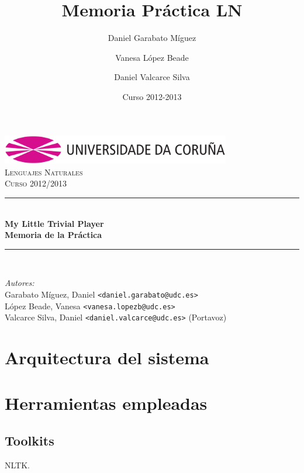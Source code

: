 \documentclass[12pt,a4paper,titlepage]{article}
\author{
	Daniel Garabato Míguez
	\and Vanesa López Beade
	\and Daniel Valcarce Silva
}
\title{Memoria Práctica LN}
\date{Curso 2012-2013}
\newcommand{\HRule}{\rule{\linewidth}{0.5mm}}
\begin{document}
\begin{titlepage}
\begin{center}
\includegraphics[width=10cm]{logo_udc}\\
\vspace{1cm}
\textsc{\Large Lenguajes Naturales}\\[0.5cm]
\textsc{\Large Curso 2012/2013}\\[0.5cm]

\HRule \\[0.4cm]
{ \huge \bfseries My Little Trivial Player}\\[0.4cm]
{ \Large \bfseries Memoria de la Práctica}\\[0cm]

\HRule \\[0cm]
\end{center}

\vfill
\emph{Autores:}
\vspace{0.5cm}
\\
\vspace{0.1cm}
Garabato Míguez, Daniel \texttt{<daniel.garabato@udc.es>}\\
\vspace{0.1cm}
López Beade, Vanesa \texttt{<vanesa.lopezb@udc.es>}\\
\vspace{0.1cm}
Valcarce Silva, Daniel \texttt{<daniel.valcarce@udc.es>} (Portavoz)\\

\end{titlepage}


\tableofcontents
\newpage

\section{Arquitectura del sistema}



\newpage
\section{Herramientas empleadas}

\subsection{Toolkits}
NLTK.
\end{document}
